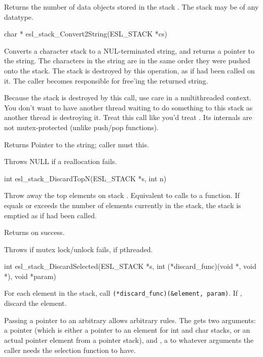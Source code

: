 \begin{sreapi}
Returns the number of data objects stored in the
stack . The stack may be of any datatype.


\hypertarget{func:esl_stack_Convert2String()}
{\item[char * esl\_stack\_Convert2String(ESL\_STACK *cs)]}

Converts a character stack  to a NUL-terminated
string, and returns a pointer to the string. The
characters in the string are in the same order they
were pushed onto the stack.  The stack is destroyed by
this operation, as if  had been
called on it. The caller becomes responsible for
free'ing the returned string.

Because the stack is destroyed by this call, use care in
a multithreaded context. You don't want to have another
thread waiting to do something to this stack as another
thread is destroying it. Treat this call like
you'd treat . Its internals are
not mutex-protected (unlike push/pop functions).

Returns Pointer to the string; caller must  this.

Throws NULL if a reallocation fails.


\hypertarget{func:esl_stack_DiscardTopN()}
{\item[int esl\_stack\_DiscardTopN(ESL\_STACK *s, int n)]}

Throw away the top  elements on stack .
Equivalent to  calls to a  function.
If  equals or exceeds the number of elements 
currently in the stack, the stack is emptied
as if  had been called.

Returns  on success.

Throws  if mutex lock/unlock fails, if pthreaded.


\hypertarget{func:esl_stack_DiscardSelected()}
{\item[int esl\_stack\_DiscardSelected(ESL\_STACK *s, int (*discard\_func)(void *, void *), void *param)]}

For each element in the stack, call \verb+(*discard_func)(&element, param)+.
If , discard the element. 

Passing a pointer to an arbitrary 
allows arbitrary rules. The  gets two
arguments: a pointer (which is either a pointer to an
element for int and char stacks, or an actual pointer
element from a pointer stack), and , a 
to whatever arguments the caller needs the selection
function to have.


\end{sreapi}
